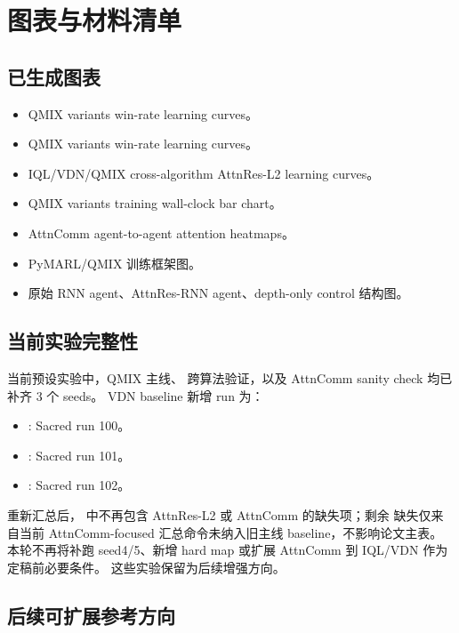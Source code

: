 \section{图表与材料清单}

\subsection{已生成图表}

\begin{itemize}
  \item {} QMIX variants win-rate learning curves。
  \item {} QMIX variants win-rate learning curves。
  \item {} IQL/VDN/QMIX cross-algorithm AttnRes-L2 learning curves。
  \item {} QMIX variants training wall-clock bar chart。
  \item AttnComm agent-to-agent attention heatmaps。
  \item PyMARL/QMIX 训练框架图。
  \item 原始 RNN agent、AttnRes-RNN agent、depth-only control 结构图。
\end{itemize}

\subsection{当前实验完整性}

当前预设实验中，QMIX 主线、 跨算法验证，以及  AttnComm sanity check 均已补齐 3 个 seeds。
VDN baseline 新增 run 为：

\begin{itemize}
  \item {}: Sacred run 100。
  \item {}: Sacred run 101。
  \item {}: Sacred run 102。
\end{itemize}

重新汇总后， 中不再包含  AttnRes-L2 或 AttnComm 的缺失项；剩余  缺失仅来自当前 AttnComm-focused 汇总命令未纳入旧主线 baseline，不影响论文主表。
本轮不再将补跑  seed4/5、新增 hard map 或扩展 AttnComm 到 IQL/VDN 作为定稿前必要条件。
这些实验保留为后续增强方向。

\subsection{后续可扩展参考方向}

